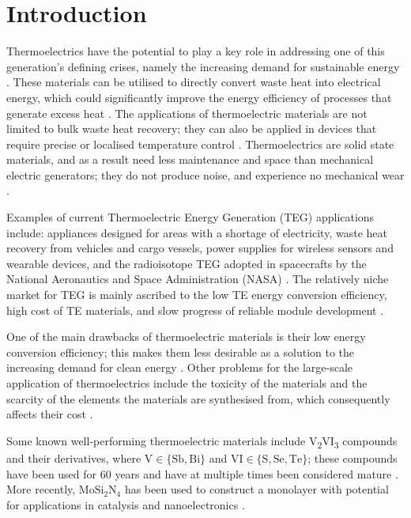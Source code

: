 \documentclass[7.5pt]{article}
\theoremstyle{plain}
\theoremstyle{definition}
\newcommand{\<}{\langle}
\renewcommand{\>}{\rangle}
\begin{document}
\section{Introduction}
\begin{multicols}{2}
\noindent Thermoelectrics have the potential to play a key role in addressing one of this generation's defining crises, namely the increasing demand for sustainable energy \cite{Wang2021}. These materials can be utilised to directly convert waste heat into electrical energy, which could significantly improve the energy efficiency of processes that generate excess heat \cite{Wang2021}.
The applications of thermoelectric materials are not limited to bulk waste heat recovery; they can also be applied in devices that require precise or localised temperature control \cite{1616249}.
Thermoelectrics are solid state materials, and as a result need less maintenance and space than mechanical electric generators; they do not produce noise, and experience no mechanical wear \cite{SnyderGJeffrey2008Ctm}.

Examples of current Thermoelectric Energy Generation (TEG) applications include: appliances designed for areas with a shortage of electricity, waste heat recovery from vehicles and cargo vessels, power supplies for wireless sensors and wearable devices, and the radioisotope TEG adopted in spacecrafts by the National Aeronautics and Space Administration (NASA) \cite{CHAMPIER2017167, doi:10.2514/6.2005-5713, 10.4108/icst.bodynets.2014.257119}.  
The relatively niche market for TEG is mainly ascribed to the low TE energy conversion efficiency, high cost of TE materials, and slow progress of reliable module development \cite{doi:10.1179/095066003225010182}.

One of the main drawbacks of thermoelectric materials is their low energy conversion efficiency; this makes them less desirable as a solution to the increasing demand for clean energy \cite{SnyderGJeffrey2008Ctm}.
Other problems for the large-scale application of thermoelectrics include the toxicity of the materials and the scarcity of the elements the materials are synthesised from, which consequently affects their cost \cite{LiuWei2017Ehst}.

Some known well-performing thermoelectric materials include V\textsubscript{2}VI\textsubscript{3} compounds and their derivatives, where $\text{V} \in \{\text{Sb}, \text{Bi}\}$ and $\text{VI} \in \{\text{S}, \text{Se}, \text{Te}\}$; these compounds have been used for 60 years and have at multiple times been considered mature \cite{https://doi.org/10.1002/advs.201600004}. 
More recently, $\text{MoSi}_{2}\text{N}_{4}$ has been used to construct a monolayer with potential for applications in catalysis and nanoelectronics \cite{MA2022153214}.


\end{multicols}
\end{document}

